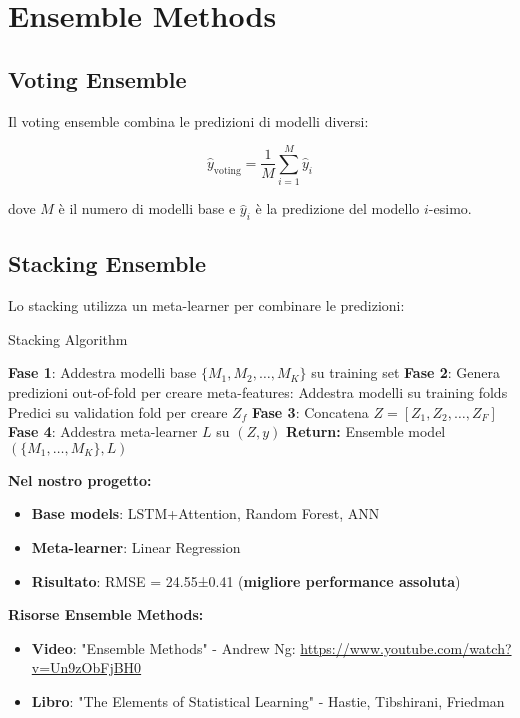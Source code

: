 \documentclass[12pt,a4paper,twoside]{report}
\begin{document}
\section{Ensemble Methods}

\subsection{Voting Ensemble}

Il voting ensemble combina le predizioni di modelli diversi:

\begin{equation}
\hat{y}_{\text{voting}} = \frac{1}{M} \sum_{i=1}^{M} \hat{y}_i
\end{equation}

dove $M$ è il numero di modelli base e $\hat{y}_i$ è la predizione del modello $i$-esimo.

\subsection{Stacking Ensemble}

Lo stacking utilizza un meta-learner per combinare le predizioni:

\begin{algorithm}
\caption{Stacking Algorithm}
\begin{algorithmic}[1]
\STATE \textbf{Fase 1}: Addestra modelli base $\{M_1, M_2, \ldots, M_K\}$ su training set
\STATE \textbf{Fase 2}: Genera predizioni out-of-fold per creare meta-features:
    \STATE Addestra modelli su training folds
    \STATE Predici su validation fold per creare $Z_f$
\ENDFOR
\STATE \textbf{Fase 3}: Concatena $Z = [Z_1, Z_2, \ldots, Z_F]$
\STATE \textbf{Fase 4}: Addestra meta-learner $L$ su $(Z, y)$
\STATE \textbf{Return:} Ensemble model $(\{M_1, \ldots, M_K\}, L)$
\end{algorithmic}
\end{algorithm}

\textbf{Nel nostro progetto:}
\begin{itemize}
    \item \textbf{Base models}: LSTM+Attention, Random Forest, ANN
    \item \textbf{Meta-learner}: Linear Regression
    \item \textbf{Risultato}: RMSE = 24.55±0.41 (\textbf{migliore performance assoluta})
\end{itemize}

\textbf{Risorse Ensemble Methods:}
\begin{itemize}
    \item \textbf{Video}: "Ensemble Methods" - Andrew Ng: \url{https://www.youtube.com/watch?v=Un9zObFjBH0}
    \item \textbf{Libro}: "The Elements of Statistical Learning" - Hastie, Tibshirani, Friedman
\end{itemize}
\end{document}
